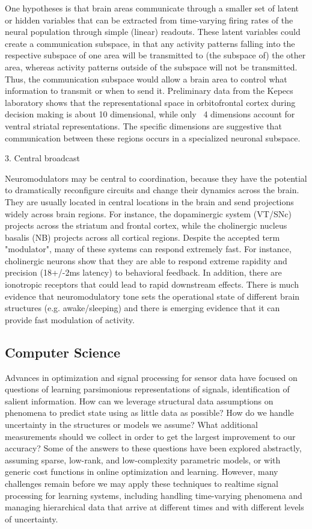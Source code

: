 \documentclass[12pt]{report}
\begin{document}
One hypotheses is that brain areas communicate through a smaller set of latent
or hidden variables that can be extracted from time-varying firing rates of
the neural population through simple (linear) readouts. These latent variables
could create a communication subspace, in that any activity patterns falling
into the respective subspace of one area will be transmitted to (the subspace
of) the other area, whereas activity patterns outside of the subspace will not
be transmitted. Thus, the communication subspace would allow a brain area to
control what information to transmit or when to send it. Preliminary data from
the Kepecs laboratory shows that the representational space in orbitofrontal
cortex during decision making is about 10 dimensional, while only ~4 dimensions
account for ventral striatal representations. The specific dimensions are
suggestive that communication between these regions occurs in a specialized
neuronal subspace.

3. Central broadcast

Neuromodulators may be central to coordination, because they have the potential
to dramatically reconfigure circuits and change their dynamics across the brain.
They are usually located in central locations in the brain and send projections
widely across brain regions. For instance, the dopaminergic system (VT/SNc)
projects across the striatum and frontal cortex, while the cholinergic nucleus
basalis (NB) projects across all cortical regions. Despite the accepted term
"modulator", many of these systems can respond extremely fast. For instance,
cholinergic neurons show that they are able to respond extreme rapidity and
precision (18+/-2ms latency) to behavioral feedback. In addition, there are
ionotropic receptors that could lead to rapid downstream effects. There is
much evidence that neuromodulatory tone sets the operational state of different
brain structures (e.g. awake/sleeping) and there is emerging evidence that it
can provide fast modulation of activity.

\subsection{Computer Science}
Advances in optimization and signal processing for sensor data have focused on questions of learning parsimonious representations of signals, identification of salient information. How can we leverage structural data assumptions on phenomena to predict state using as little data as possible? How do we handle uncertainty in the structures or models we assume? What additional measurements should we collect in order to get the largest improvement to our accuracy? Some of the answers to these questions have been explored abstractly, assuming sparse, low-rank, and low-complexity parametric models, or with generic cost functions in online optimization and learning. However, many challenges remain before we may apply these techniques to realtime signal processing for learning systems, including handling time-varying phenomena and managing hierarchical data that arrive at different times and with different levels of uncertainty.
\end{document}
